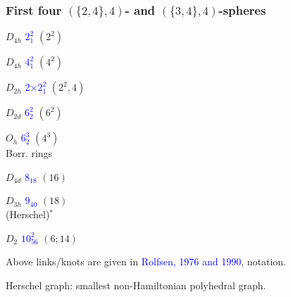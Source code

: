 \documentclass{beamer}
\begin{document}
\begin{frame}\frametitle{First four $(\{2,4\},4)$- and  $(\{3,4\},4)$-spheres}
\vspace{-4mm}
\begin{center}
\begin{minipage}[b]{24mm}
\centering
{}\par
$D_{4h}$ \textcolor{blue}{$2^2_1$} $(2^2)$
\end{minipage}
\begin{minipage}[b]{21mm}
\centering
{}\par
$D_{4h}$ \textcolor{blue}{$4^2_1$}  $(4^2)$
\end{minipage}
\begin{minipage}[b]{29mm}
\centering
{}\par
$D_{2h}$ 
\textcolor{blue}{$2$$\times$$ 2^2_1$} 
 $(2^2,4)$ 
\end{minipage}
\begin{minipage}[b]{24mm}
\centering
{}\par
$D_{2d}$ \textcolor{blue}{$6^2_2$}  $(6^2)$
\end{minipage}
\end{center}

\begin{center}
\begin{minipage}[b]{24mm}
\centering     
{}\par
$O_h$ \textcolor{blue}{$6^3_2$} $(4^3)$\\
Borr. rings
\end{minipage}
\begin{minipage}[b]{24mm}
\centering
{}\par
$D_{4d}$ \textcolor{blue}{$8_{18}$} $(16)$
\end{minipage}
\begin{minipage}[b]{23mm}
\centering
{}\par
$D_{3h}$ \textcolor{blue}{$9_{40}$} $(18)$\\
(Herschel)$^{*}$
\end{minipage}
\begin{minipage}[b]{23mm}
\centering
{}\par
$D_{2}$ 
\textcolor{blue}{$10^2_{56}$} 
 $(6;14)$
\end{minipage}
\end{center}
Above links/knots  are given in \textcolor{blue}{Rolfsen, 1976 and 1990}, 
 notation.

Herschel graph:
smallest non-Hamiltonian polyhedral 
 graph.
\end{frame}
\end{document}

